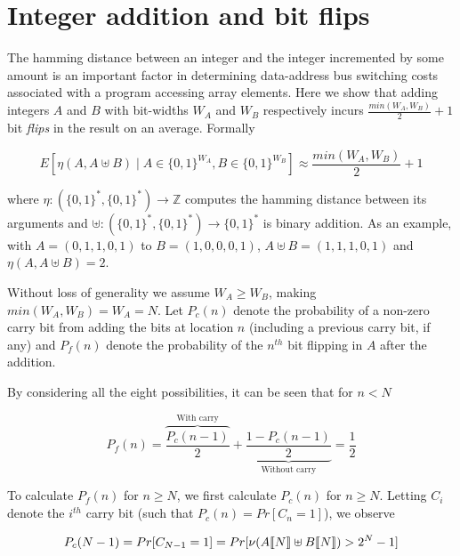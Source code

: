 \chapter{Integer addition and bit flips}

\label{AppendixC}


The hamming distance between an integer and the integer incremented by
some amount is an important factor in determining data-address bus
switching costs associated with a program accessing array elements.
Here we show that adding integers $A$ and $B$ with bit-widths $W_A$
and $W_B$ respectively incurs $\frac{min(W_A, W_B)}{2} + 1$ bit
\textit{flips} in the result on an average.  Formally

\begin{equation}
  E[\eta(A, A \uplus B) \mid A \in \{0, 1\}^{W_A}, B \in \{0,
    1\}^{W_B} ] \approx \frac{min(W_A, W_B)}{2} + 1
\end{equation}

where $\eta : (\{0, 1\}^*, \{0, 1\}^*) \to \mathbb{Z}$ computes the
hamming distance between its arguments and $\uplus : (\{0, 1\}^*, \{0,
1\}^*) \to \{0, 1\}^*$ is binary addition.  As an example, with $A =
(0, 1, 1, 0, 1)$ to $B = (1, 0, 0, 0, 1)$, $A \uplus B = (1, 1, 1, 0,
1)$ and $\eta(A, A \uplus B) = 2$.

Without loss of generality we assume $W_A \geq W_B$, making $min(W_A,
W_B) = W_A = N$.  Let $P_c(n)$ denote the probability of a non-zero
carry bit from adding the bits at location $n$ (including a previous
carry bit, if any) and $P_f(n)$ denote the probability of the $n^{th}$
bit flipping in $A$ after the addition.

By considering all the eight possibilities, it can be seen that for $n
< N$

\begin{equation}
    P_f(n) = \overbrace{\frac{P_c(n - 1)}{2}}^{\text{With carry}} +
    \underbrace{\frac{1 - P_c(n - 1)}{2}}_{\text{Without carry}} = \frac{1}{2}
\end{equation}

To calculate $P_f(n)$ for $n \geq N$, we first calculate $P_c(n)$ for
$n \geq N$.  Letting $C_i$ denote the $i^{th}$ carry bit (such that
$P_c(n) = Pr[C_n = 1]$), we observe

\begin{equation}
  P_c(N - 1) = Pr[C_{N - 1} = 1] = Pr[\nu(A\llbracket N \rrbracket  \uplus
    B\llbracket N \rrbracket ) > 2^N - 1]
\end{equation}

